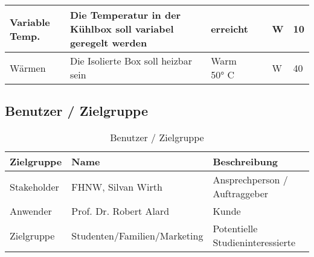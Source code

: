 \begin{table}[H]
{\begin{tabular}{|llllll|}
    \multicolumn{1}{|l|}{Variable Temp.}  & \multicolumn{1}{l|}{Die Temperatur in   der Kühlbox soll variabel geregelt werden}               & \multicolumn{1}{l|}{erreicht}         & \multicolumn{1}{l|}{}                   & \multicolumn{1}{l|}{W}                & 10                 \\ \hline
    \multicolumn{1}{|l|}{Wärmen}          & \multicolumn{1}{l|}{Die Isolierte Box   soll heizbar sein}                                       & \multicolumn{1}{l|}{Warm 50° C}       & \multicolumn{1}{l|}{}                   & \multicolumn{1}{l|}{W}                & 40                 \\ \hline
    \end{tabular}%
    }
    \end{table}

\subsection{Benutzer / Zielgruppe}
\begin{table}[H]
    \centering
    \caption{Benutzer / Zielgruppe}
    \label{tab:my-table}
    \begin{tabular}{|l|l|l|}
    \hline
    \rowcolor[HTML]{E0E0E0} 
    \textbf{Zielgruppe} & \textbf{Name}                & \textbf{Beschreibung}            \\ \hline
    Stakeholder         & FHNW, Silvan Wirth           & Ansprechperson / Auftraggeber    \\ \hline
    Anwender            & Prof. Dr. Robert   Alard     & Kunde                            \\ \hline
    Zielgruppe          & Studenten/Familien/Marketing & Potentielle Studieninteressierte \\ \hline
    \end{tabular}
    \end{table}